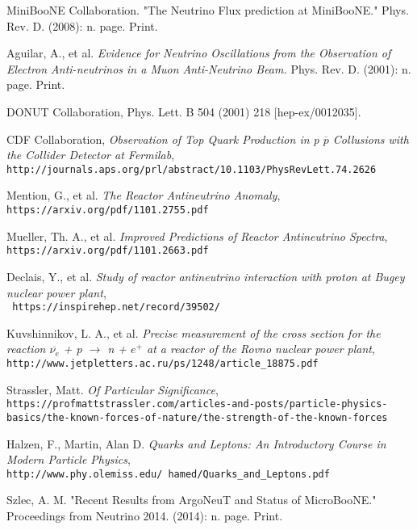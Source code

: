 \documentclass[12pt]{article}
\begin{document}
\begin{thebibliography}{20}
MiniBooNE Collaboration. "The Neutrino Flux prediction at MiniBooNE." Phys. Rev. D. (2008): n. page. Print.

Aguilar, A., et al. \emph{Evidence for Neutrino Oscillations from the Observation of Electron Anti-neutrinos in a Muon Anti-Neutrino Beam.} Phys. Rev. D. (2001): n. page. Print.

DONUT Collaboration, Phys. Lett. B 504 (2001) 218 [hep-ex/0012035].

CDF Collaboration, \emph{Observation of Top Quark Production in p $\overline{p}$ Collusions with the Collider Detector at Fermilab},\\
  \texttt{http://journals.aps.org/prl/abstract/10.1103/PhysRevLett.74.2626}

Mention, G., et al. \emph{The Reactor Antineutrino Anomaly},\\
  \texttt{https://arxiv.org/pdf/1101.2755.pdf}


Mueller, Th. A., et al. \emph{Improved Predictions of Reactor Antineutrino Spectra},\\
  \texttt{https://arxiv.org/pdf/1101.2663.pdf}

Declais, Y., et al. \emph{Study of reactor antineutrino interaction with proton at Bugey nuclear power plant},\\
  \texttt{ https://inspirehep.net/record/39502/}

Kuvshinnikov, L. A., et al. \emph{Precise measurement of the cross section for the reaction $\overline{\nu_e}$ + p $\rightarrow$ n + $e^+$ at a reactor of the Rovno nuclear power plant},\\
  \texttt{http://www.jetpletters.ac.ru/ps/1248/article\_18875.pdf}




Strassler, Matt. \emph{Of Particular Significance},\\
  \texttt{https://profmattstrassler.com/articles-and-posts/particle-physics-basics/the-known-forces-of-nature/the-strength-of-the-known-forces}

Halzen, F., Martin, Alan D. \emph{Quarks and Leptons: An Introductory Course in Modern Particle Physics},\\
  \texttt{http://www.phy.olemiss.edu/~hamed/Quarks\_and\_Leptons.pdf}

Szlec, A. M. "Recent Results from ArgoNeuT and Status of MicroBooNE." Proceedings from Neutrino 2014. (2014): n. page. Print.


\end{thebibliography}
\end{document}
